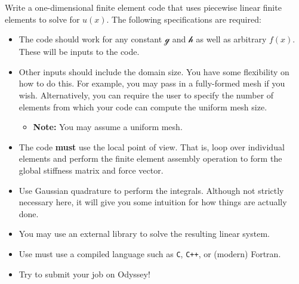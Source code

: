 \documentclass[11pt]{article}
\newcommand{\lr}[1]{\left(#1\right)}
\begin{document}
  Write a one-dimensional finite element code that uses piecewise linear finite elements to solve for $u\lr{x}$.  The
following specifications are required:
  \begin{itemize}
    \item The code should work for any constant $\mathcal{g}$ and $\mathcal{h}$ as well as arbitrary $f\lr{x}$.  These will be inputs to the
code.
    \item Other inputs should include the domain size.  You have some flexibility on how to do this.  For example, you may
pass in a fully-formed mesh if you wish.  Alternatively, you can require the user to specify the number of elements from
which your code can compute the uniform mesh size.
      \begin{itemize}
        \item \textbf{Note:} You may assume a uniform mesh.
      \end{itemize}
    \item The code \textbf{must} use the local point of view.  That is, loop over individual elements and perform the finite
element assembly operation to form the global stiffness matrix and force vector.
    \item Use Gaussian quadrature to perform the integrals.  Although not strictly necessary here, it will give you some
intuition for how things are actually done.
    \item You may use an external library to solve the resulting linear system.
    \item Use must use a compiled language such as \texttt{C}, \texttt{C++}, or (modern) Fortran.
    \item Try to submit your job on Odyssey!
  \end{itemize}
\end{document}
